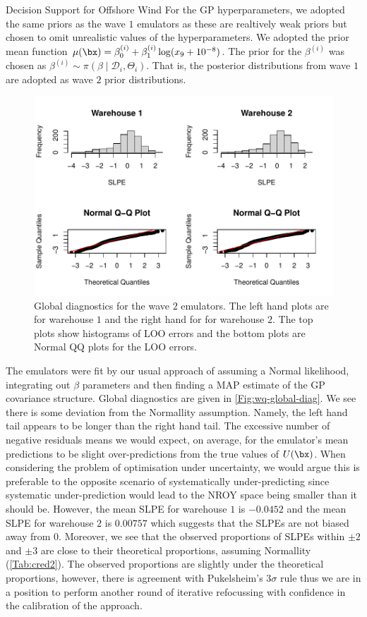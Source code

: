 \begin{chapter}{Decision Support for Offshore Wind \label{Ch:ds-for-ow}}
For the GP hyperparameters, we adopted the same priors as the wave $1$ emulators as these are realtively weak priors but chosen to omit unrealistic values of the hyperparameters. We adopted the prior mean function $\mu(\bx) = \beta^{(i)}_0 + \beta^{(i)}_1 \log (x_9 + 10^{-8})$. The prior for the $\beta^{(i)}$ was chosen as $\beta^{(i)} \sim \pi(\beta \mid \mathcal{D}_i, \Theta_i)$. That is, the posterior distributions from wave $1$ are adopted as wave $2$ prior distributions.
\begin{figure}
  \centering
  \includegraphics{fig-ds/diagnostics-wave2.pdf}
  \caption{Global diagnostics for the wave $2$ emulators. The left hand plots are for warehouse $1$ and the right hand for for warehouse $2$. The top plots show histograms of LOO errors and the bottom plots are Normal QQ plots for the LOO errors.\label{Fig:w2-global-diag}}
\end{figure}
The emulators were fit by our usual approach of assuming a Normal likelihood, integrating out $\beta$ parameters and then finding a MAP estimate of the GP covariance structure. Global diagnostics are given in \cref{Fig:wq-global-diag}. We see there is some deviation from the Normallity assumption. Namely, the left hand tail appears to be longer than the right hand tail. The excessive number of negative residuals means we would expect, on average, for the emulator's mean predictions to be slight over-predictions from the true values of $U(\bx)$. When considering the problem of optimisation under uncertainty, we would argue this is preferable to the opposite scenario of systematically under-predicting since systematic under-prediction would lead to the NROY space being smaller than it should be. However, the mean SLPE for warehouse $1$ is $-0.0452$ and the mean SLPE for warehouse $2$ is $0.00757$ which suggests that the SLPEs are not biased away from $0$. Moreover, we see that the observed proportions of SLPEs within $\pm2$ and $\pm3$ are close to their theoretical proportions, assuming Normallity (\cref{Tab:cred2}).  The observed proportions are slightly under the theoretical proportions, however, there is agreement with Pukelsheim's $3\sigma$ rule thus we are in a position to perform another round of iterative refocussing with confidence in the calibration of the approach.

\end{chapter}
